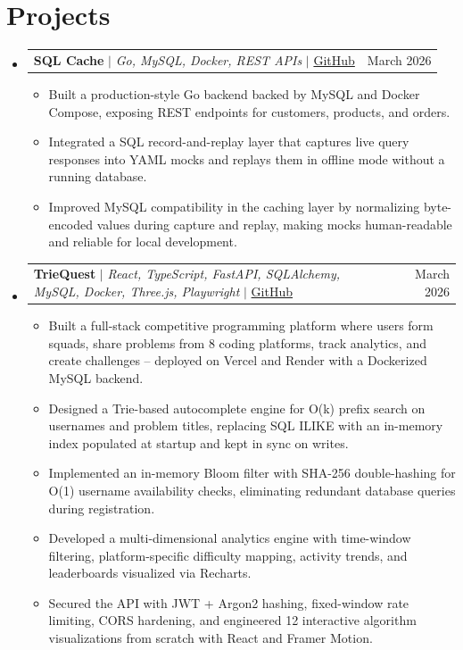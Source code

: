 \documentclass[letterpaper,11pt]{article}
\makeatletter
\newcommand{\resumeItem}[1]{
  \item\small{
    {#1 \vspace{-2pt}}
  }
}
\newcommand{\resumeProjectHeading}[2]{
    \item
    \begin{tabular*}{0.97\textwidth}{l@{\extracolsep{\fill}}r}
      \small#1 & #2 \\
    \end{tabular*}\vspace{-7pt}
}
\newcommand{\resumeSubHeadingListStart}{\begin{itemize}[leftmargin=0.15in, label={}]}
\newcommand{\resumeSubHeadingListEnd}{\end{itemize}}
\newcommand{\resumeItemListStart}{\begin{itemize}}
\newcommand{\resumeItemListEnd}{\end{itemize}\vspace{-5pt}}
\makeatother
\begin{document}
\section{Projects}
    \resumeSubHeadingListStart
      \resumeProjectHeading
          {\textbf{SQL Cache} $|$ \emph{Go, MySQL, Docker, REST APIs} $|$ \href{https://github.com/officialasishkumar/sql-cache}{GitHub}}{March 2026} %
          \resumeItemListStart
            \resumeItem{Built a production-style Go backend backed by MySQL and Docker Compose, exposing REST endpoints for customers, products, and orders.}
            \resumeItem{Integrated a SQL record-and-replay layer that captures live query responses into YAML mocks and replays them in offline mode without a running database.}
            \resumeItem{Improved MySQL compatibility in the caching layer by normalizing byte-encoded values during capture and replay, making mocks human-readable and reliable for local development.}
          \resumeItemListEnd
      \resumeProjectHeading
          {\textbf{TrieQuest} $|$ \emph{React, TypeScript, FastAPI, SQLAlchemy, MySQL, Docker, Three.js, Playwright} $|$ \href{https://github.com/officialasishkumar/TrieQuest}{GitHub}}{March 2026} %
          \resumeItemListStart
            \resumeItem{Built a full-stack competitive programming platform where users form squads, share problems from 8 coding platforms, track analytics, and create challenges -- deployed on Vercel and Render with a Dockerized MySQL backend.}
            \resumeItem{Designed a Trie-based autocomplete engine for O(k) prefix search on usernames and problem titles, replacing SQL ILIKE with an in-memory index populated at startup and kept in sync on writes.}
            \resumeItem{Implemented an in-memory Bloom filter with SHA-256 double-hashing for O(1) username availability checks, eliminating redundant database queries during registration.}
            \resumeItem{Developed a multi-dimensional analytics engine with time-window filtering, platform-specific difficulty mapping, activity trends, and leaderboards visualized via Recharts.}
            \resumeItem{Secured the API with JWT + Argon2 hashing, fixed-window rate limiting, CORS hardening, and engineered 12 interactive algorithm visualizations from scratch with React and Framer Motion.}
          \resumeItemListEnd
      
    \resumeSubHeadingListEnd


\end{document}
